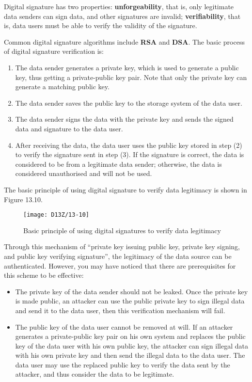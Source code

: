 \documentclass[a4paper,12pt]{book}
\begin{document}
Digital signature has two properties: \textbf{unforgeability}, that is, only legitimate data senders can sign data, and other signatures are invalid; \textbf{verifiability}, that is, data users must be able to verify the validity of the signature.

Common digital signature algorithms include \textbf{RSA} and \textbf{DSA}. The basic process of digital signature verification is:

\begin{enumerate}[label=(\arabic*)]
    \item The data sender generates a private key, which is used to generate a public key, thus getting a private-public key pair. Note that only the private key can generate a matching public key.
    \item The data sender saves the public key to the storage system of the data user.
    \item The data sender signs the data with the private key and sends the signed data and signature to the data user.
    \item After receiving the data, the data user uses the public key stored in step (2) to verify the signature sent in step (3). If the signature is correct, the data is considered to be from a legitimate data sender; otherwise, the data is considered unauthorised and will not be used.
\end{enumerate}

The basic principle of using digital signature to verify data legitimacy is shown in Figure 13.10.

\begin{figure}[!h]
    \centering
    \texttt{[image: D13Z/13-10]}
    \caption{Basic principle of using digital signatures to verify data legitimacy}
\end{figure}

Through this mechanism of “private key issuing public key, private key signing, and public key verifying signature”, the legitimacy of the data source can be authenticated. However, you may have noticed that there are prerequisites for this scheme to be effective:

\begin{itemize}[leftmargin=1.5em]
    \item The private key of the data sender should not be leaked. Once the private key is made public, an attacker can use the public private key to sign illegal data and send it to the data user, then this verification mechanism will fail.
    \item The public key of the data user cannot be removed at will. If an attacker generates a private-public key pair on his own system and replaces the public key of the data user with his own public key, the attacker can sign illegal data with his own private key and then send the illegal data to the data user. The data user may use the replaced public key to verify the data sent by the attacker, and thus consider the data to be legitimate.
\end{itemize}
\end{document}
